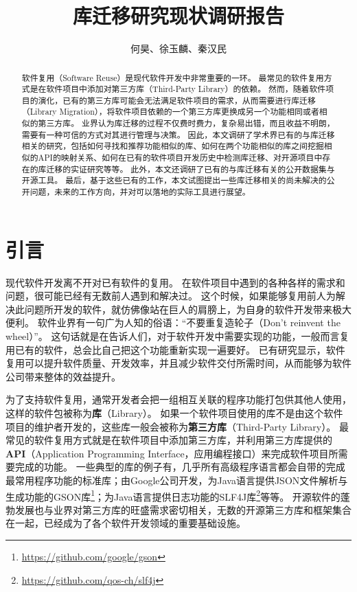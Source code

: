 \documentclass[UTF8]{ctexart}
\title{库迁移研究现状调研报告}
\author{何昊、徐玉麟、秦汉民}
\begin{document}
\maketitle

\begin{abstract}
	软件复用（Software Reuse）是现代软件开发中非常重要的一环。
    最常见的软件复用方式是在软件项目中添加对第三方库（Third-Party Library）的依赖。
	然而，随着软件项目的演化，已有的第三方库可能会无法满足软件项目的需求，从而需要进行库迁移（Library Migration），将软件项目依赖的一个第三方库更换成另一个功能相同或者相似的第三方库。
	业界认为库迁移的过程不仅费时费力，复杂易出错，而且收益不明朗，需要有一种可信的方式对其进行管理与决策。
	因此，本文调研了学术界已有的与库迁移相关的研究，包括如何寻找和推荐功能相似的库、如何在两个功能相似的库之间挖掘相似的API的映射关系、如何在已有的软件项目开发历史中检测库迁移、对开源项目中存在的库迁移的实证研究等等。
	此外，本文还调研了已有的与库迁移有关的公开数据集与开源工具。
	最后，基于这些已有的工作，本文试图提出一些库迁移相关的尚未解决的公开问题，未来的工作方向，并对可以落地的实际工具进行展望。
\end{abstract}

\section{引言}


现代软件开发离不开对已有软件的复用。
在软件项目中遇到的各种各样的需求和问题，很可能已经有无数前人遇到和解决过。
这个时候，如果能够复用前人为解决此问题所开发的软件，就仿佛像站在巨人的肩膀上，为自身的软件开发带来极大便利。
软件业界有一句广为人知的俗语：“不要重复造轮子（Don't reinvent the wheel）”。
这句话就是在告诉人们，对于软件开发中需要实现的功能，一般而言复用已有的软件，总会比自己把这个功能重新实现一遍要好。
已有研究显示，软件复用可以提升软件质量、开发效率，并且减少软件交付所需时间，从而能够为软件公司带来整体的效益提升\cite{1992-Levis-Empirical, 1994IEEESoftware-Lim-Effects}。

为了支持软件复用，通常开发者会把一组相互关联的程序功能打包供其他人使用，这样的软件包被称为\textbf{库}（Library）。
如果一个软件项目使用的库不是由这个软件项目的维护者开发的，这些库一般会被称为\textbf{第三方库}（Third-Party Library）。
最常见的软件复用方式就是在软件项目中添加第三方库，并利用第三方库提供的\textbf{API}（Application Programming Interface，应用编程接口）来完成软件项目所需要完成的功能。
一些典型的库的例子有，几乎所有高级程序语言都会自带的完成最常用程序功能的标准库；由Google公司开发，为Java语言提供JSON文件解析与生成功能的GSON库\footnote{\url{https://github.com/google/gson}}；为Java语言提供日志功能的SLF4J库\footnote{\url{https://github.com/qos-ch/slf4j}}等等。
开源软件的蓬勃发展也与业界对第三方库的旺盛需求密切相关，无数的开源第三方库和框架集合在一起，已经成为了各个软件开发领域的重要基础设施。
\end{document}
